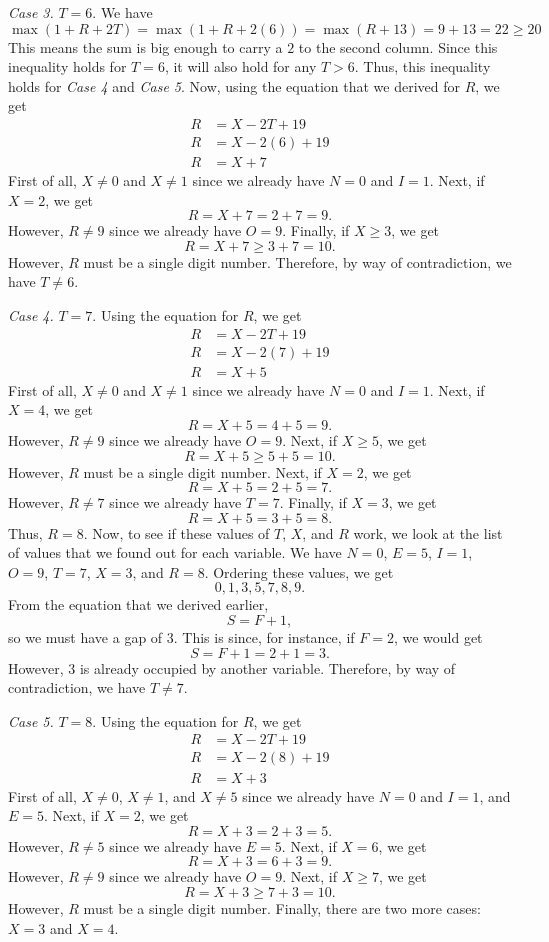 \documentclass[12pt]{article}
\begin{document}
\noindent\textit{Case 3.} $T=6$. We have
\[\max(1+R+2T)=\max(1+R+2(6))=\max(R+13)=9+13=22\geq 20\]
This means the sum is big enough to carry a $2$ to the second column. Since this inequality holds for $T=6$, it will also hold for any $T>6$. Thus, this inequality holds for \textit{Case 4} and \textit{Case 5}. Now, using the equation that we derived for $R$, we get
\begin{align*}
    R&=X-2T+19\\
    R&=X-2(6)+19\\
    R&=X+7
\end{align*}
First of all, $X\neq 0$ and $X\neq 1$ since we already have $N=0$ and $I=1$. Next, if $X=2$, we get
\[R=X+7=2+7=9.\]
However, $R\neq 9$ since we already have $O=9$. Finally, if $X\geq 3$, we get
\[R=X+7\geq 3+7=10.\]
However, $R$ must be a single digit number. Therefore, by way of contradiction, we have $T\neq 6$.
\newpage

\noindent\textit{Case 4.} $T=7$. Using the equation for $R$, we get
\begin{align*}
    R&=X-2T+19\\
    R&=X-2(7)+19\\
    R&=X+5
\end{align*}
First of all, $X\neq 0$ and $X\neq 1$ since we already have $N=0$ and $I=1$. Next, if $X=4$, we get
\[R=X+5=4+5=9.\]
However, $R\neq 9$ since we already have $O=9$. Next, if $X\geq 5$, we get
\[R=X+5\geq 5+5=10.\]
However, $R$ must be a single digit number. Next, if $X=2$, we get
\[R=X+5=2+5=7.\]
However, $R\neq 7$ since we already have $T=7$. Finally, if $X=3$, we get
\[R=X+5=3+5=8.\]
Thus, $R=8$. Now, to see if these values of $T$, $X$, and $R$ work, we look at the list of values that we found out for each variable. We have $N=0$, $E=5$, $I=1$, $O=9$, $T=7$, $X=3$, and $R=8$. Ordering these values, we get
\[0,1,3,5,7,8,9.\]
From the equation that we derived earlier,
\[S=F+1,\]
so we must have a gap of $3$. This is since, for instance, if $F=2$, we would get \[S=F+1=2+1=3.\]
However, $3$ is already occupied by another variable. Therefore, by way of contradiction, we have $T\neq 7$.
\newpage

\noindent\textit{Case 5.} $T=8$. Using the equation for $R$, we get
\begin{align*}
    R&=X-2T+19\\
    R&=X-2(8)+19\\
    R&=X+3
\end{align*}
First of all, $X\neq 0$, $X\neq 1$, and $X\neq 5$ since we already have $N=0$ and $I=1$, and $E=5$. Next, if $X=2$, we get
\[R=X+3=2+3=5.\]
However, $R\neq 5$ since we already have $E=5$. Next, if $X=6$, we get
\[R=X+3=6+3=9.\]
However, $R\neq 9$ since we already have $O=9$. Next, if $X\geq 7$, we get
\[R=X+3\geq 7+3=10.\]
However, $R$ must be a single digit number. Finally, there are two more cases: $X=3$ and $X=4$.
\vspace{20px}
\end{document}
